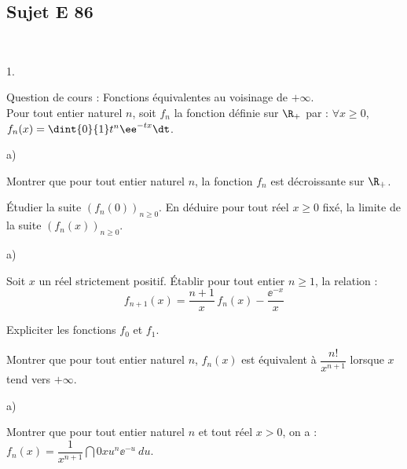 \documentclass[11pt]{article}
\begin{document}


\subsection*{Sujet E 86}


\begin{exerciceAP}~
  \begin{noliste}{1.}
    \setlength{\itemsep}{2mm}
  \item Question de cours : Fonctions équivalentes au voisinage de
    $+\infty$.\\
    Pour tout entier naturel $n$, soit $f_n$ la fonction définie sur
    $\R_+$ par : $\forall x \geq 0$, $f_n(x)=\dint{0}{1} t^n \ee^{-tx}
    \dt$.
  
  \item
    \begin{noliste}{a)}
    \setlength{\itemsep}{2mm}
    \item Montrer que pour tout entier naturel $n$, la fonction 
      $f_n$ est décroissante sur $\R_+$.
      
    \item Étudier la suite $(f_n(0))_{n\geq 0}$. En déduire pour 
      tout réel $x\geq 0$ fixé, la limite de la suite $(f_n(x))_{n\geq 
        0}$.
    \end{noliste}
    
  \item 
    \begin{noliste}{a)}
    \setlength{\itemsep}{2mm}
    \item Soit $x$ un réel strictement positif. Établir pour tout
      entier $n\geq 1$, la relation :
      \[
      f_{n+1}(x)=\dfrac{n+1}{x} \, f_n(x)-\dfrac{\ee^{-x}}{x}
      \]
      
    \item Expliciter les fonctions $f_0$ et $f_1$.
      
    \item Montrer que pour tout entier naturel $n$, $f_n(x)$ est 
      équivalent à $\dfrac{n!}{x^{n+1}}$ lorsque $x$ tend vers $+\infty$.
    \end{noliste}
    
  \item 
    \begin{noliste}{a)}
    \setlength{\itemsep}{2mm}
    \item Montrer que pour tout entier naturel $n$ et tout réel $x>0$,
      on a : $f_n(x)=\dfrac{1}{x^{n+1}}\dint{0}{x} u^n \ee^{-u} \ du$.
    

\end{noliste}
\end{noliste}
\end{exerciceAP}
\end{document}
